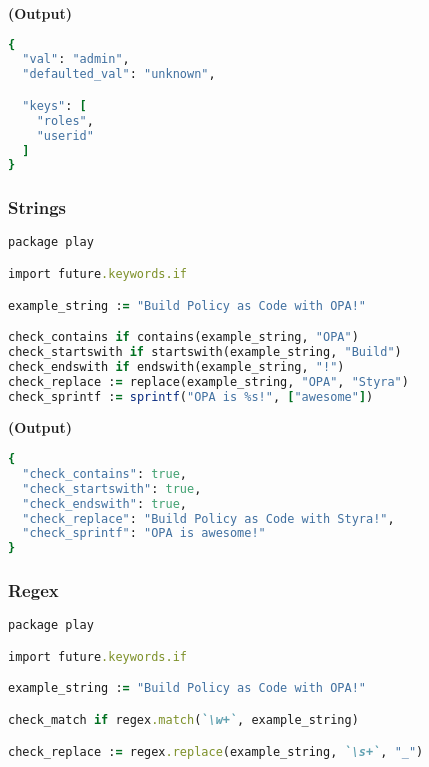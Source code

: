 \documentclass[twocolumn]{article}
\begin{document}
\textbf{\tiny{(Output)}}
\begin{lstlisting}[language=Ruby]
{
  "val": "admin",
  "defaulted_val": "unknown",

  "keys": [
    "roles",
    "userid"
  ]
}
\end{lstlisting}



\vspace{-1em}
\subsubsection*{Strings}

\begin{lstlisting}[language=Ruby]
package play

import future.keywords.if

example_string := "Build Policy as Code with OPA!"

check_contains if contains(example_string, "OPA")
check_startswith if startswith(example_string, "Build")
check_endswith if endswith(example_string, "!")
check_replace := replace(example_string, "OPA", "Styra")
check_sprintf := sprintf("OPA is %s!", ["awesome"])
\end{lstlisting}



\textbf{\tiny{(Output)}}
\begin{lstlisting}[language=Ruby]
{
  "check_contains": true,
  "check_startswith": true,
  "check_endswith": true,
  "check_replace": "Build Policy as Code with Styra!",
  "check_sprintf": "OPA is awesome!"
}
\end{lstlisting}



\vspace{-1em}
\subsubsection*{Regex}

\begin{lstlisting}[language=Ruby]
package play

import future.keywords.if

example_string := "Build Policy as Code with OPA!"

check_match if regex.match(`\w+`, example_string)

check_replace := regex.replace(example_string, `\s+`, "_")
\end{lstlisting}
\end{document}
